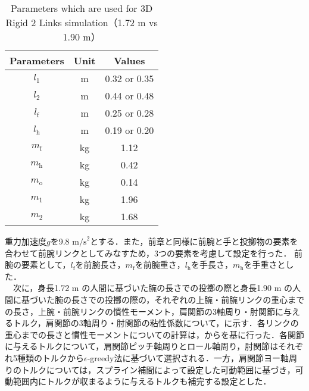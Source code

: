 \begin{table}[tb]
  \begin{center}
    \caption{Parameters which are used for 3D Rigid 2 Links simulation（1.72 m vs 1.90 m）}
    \begin{tabular}{c|c|c}
      \hline
      Parameters & Unit & Values \\
      \hline
      $l_{1}$ & m & 0.32 or 0.35 \\
      $l_{2}$ & m & 0.44 or 0.48 \\
      $l_{\mathrm{f}}$ & m & 0.25 or 0.28 \\
      $l_{\mathrm{h}}$ & m & 0.19 or 0.20 \\
      $m_{\mathrm{f}}$ & kg & 1.12 \\
      $m_{\mathrm{h}}$ & kg & 0.42 \\
      $m_{\mathrm{o}}$ & kg & 0.14 \\
      $m_{1}$ & kg & 1.96 \\
      $m_{2}$ & kg & 1.68 \\
      \hline
    \end{tabular}
  \end{center}
\end{table}

重力加速度$g$を9.8 $\mathrm{m/s}^{2}$とする．また，前章と同様に前腕と手と投擲物の要素を合わせて前腕リンクとしてみなすため，3つの要素を考慮して設定を行った．
前腕の要素として，$l_{\mathrm{f}}$を前腕長さ，$m_{\mathrm{f}}$を前腕重さ，$l_{\mathrm{h}}$を手長さ，$m_{\mathrm{h}}$を手重さとした．\\
　次に，身長1.72 m の人間に基づいた腕の長さでの投擲の際と身長1.90 m の人間に基づいた腕の長さでの投擲の際の，それぞれの上腕・前腕リンクの重心までの長さ，上腕・前腕リンクの慣性モーメント，肩関節の3軸周り・肘関節に与えるトルク，肩関節の3軸周り・肘関節の粘性係数について，に示す．各リンクの重心までの長さと慣性モーメントについての計算は，からを基に行った．各関節に与えるトルクについて，肩関節ピッチ軸周りとロール軸周り，肘関節はそれぞれ5種類のトルクから$\epsilon$-greedy法に基づいて選択される．一方，肩関節ヨー軸周りのトルクについては，スプライン補間によって設定した可動範囲に基づき，可動範囲内にトルクが収まるように与えるトルクも補完する設定とした．


